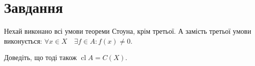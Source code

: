 
\chapter{Завдання \theHchapter}

\begin{tcolorbox}[title=Завдання]
    Нехай виконано всі умови теореми Стоуна, крім третьої. 
    А замість третьої умови виконується: 
    $\forall x \in X \quad \exists f \in A: f(x) \neq 0$. 
    
    
    Доведіть, що тоді також $\operatorname{cl}A=C(X)$.
\end{tcolorbox}

